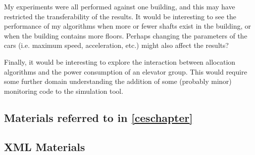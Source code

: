 \documentclass{UoYCSproject}
\begin{document}
My experiments were all performed against one building, and this may have restricted the transferability of the results.  It would be interesting to see the performance of my algorithms when more or fewer shafts exist in the building, or when the building contains more floors.  Perhaps changing the parameters of the cars (i.e. maximum speed, acceleration, etc.) might also affect the results?

Finally, it would be interesting to explore the interaction between allocation algorithms and the power consumption of an elevator group.  This would require some further domain understanding the addition  of some (probably minor) monitoring code to the simulation tool.



\appendix
\begin{appendices}

\chapter{Materials referred to in \autoref{ceschapter}}
\label{cesappendix}

\section{XML Materials}


\end{appendices}
\end{document}
